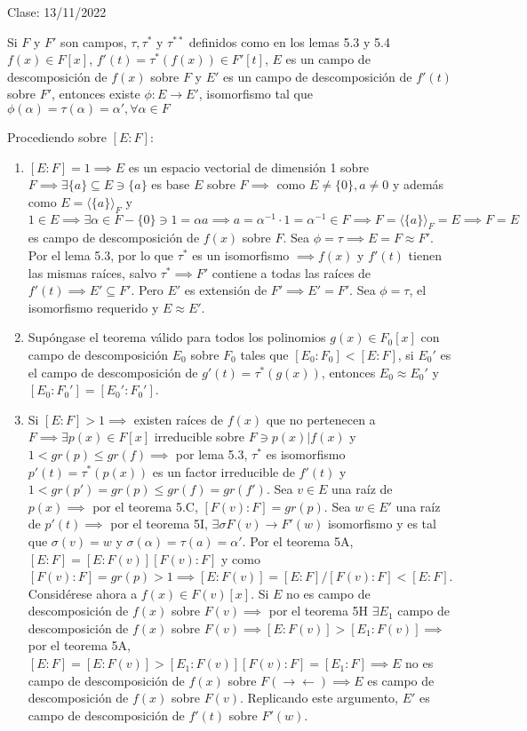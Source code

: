 Clase: 13/11/2022

\begin{teorema}
    Si $F$ y $F'$ son campos, $\tau,\tau^*$ y $\tau^{**}$ definidos como en los lemas 5.3 y 5.4 $f(x)\in F[x]$, $f'(t)=\tau^{*}(f(x))\in F'[t]$, $E$ es un campo de descomposición de $f(x)$ sobre $F$ y $E'$ es un campo de descomposición de $f'(t)$ sobre $F'$, entonces existe $\phi:E\to E'$, isomorfismo tal que $\phi(\alpha)=\tau(\alpha)=\alpha',\forall \alpha \in F$
    \begin{dem}
        Procediendo sobre $[E:F]$:
        \begin{enumerate}
            \item $[E:F]=1\implies E$ es un espacio vectorial de dimensión 1 sobre $F\implies \exists \{a\}\subseteq E\ni \{a\}$ es base $E$ sobre $F\implies$ como $E\not= \{0\},a\not=0$ y además como $E=\langle\{a\}\rangle_F$ y $1\in E\implies \exists \alpha\in F-\{0\}\ni 1=\alpha a\implies a=\alpha^{-1}\cdot 1=\alpha^{-1}\in F\implies F=\langle\{a\}\rangle_F=E\implies F=E$ es campo de descomposición de $f(x)$ sobre $F$. Sea $\phi =\tau\implies E=F\approx F'$. Por el lema 5.3, por lo que $\tau^*$ es un isomorfismo $\implies f(x)$ y $f'(t)$ tienen las mismas raíces, salvo $\tau^*\implies F'$ contiene a todas las raíces de $f'(t)\implies E'\subseteq F'$. Pero $E'$ es extensión de $F'\implies E'=F'$. Sea $\phi=\tau$, el isomorfismo requerido y $E\approx E'$.
            \item Supóngase el teorema válido para todos los polinomios $g(x)\in F_0[x]$ con campo de descomposición $E_0$ sobre $F_0$ tales que 
            $[E_0:F_0]<[E:F]$, si $E_0'$ es el campo de descomposición de $g'(t)=\tau^*(g(x))$, entonces $E_0\approx E_0'$ y $[E_0:F_0']=[E_0':F_0']$.
            \item Si $[E:F]>1\implies $ existen raíces de $f(x)$ que no pertenecen a $F\implies \exists p(x)\in F[x]$ irreducible sobre $F\ni p(x)|f(x)$ y $1<gr(p)\leq gr(f)\implies$ por lema 5.3, $\tau^*$ es isomorfismo $p'(t)=\tau^*(p(x))$ es un factor irreducible de $f'(t)$ y $1<gr(p')=gr(p)\leq gr(f)=gr(f')$. Sea $v\in E$ una raíz de $p(x)\implies$ por el teorema 5.C, $[F(v):F]=gr(p)$. Sea $w\in E'$ una raíz de $p'(t)\implies$ por el teorema 5I, $\exists\sigma F(v)\to F'(w)$ isomorfismo y es tal que $\sigma(v)=w$ y $\sigma(\alpha)=\tau(a)=\alpha'$. Por el teorema 5A, $[E:F]=[E:F(v)][F(v):F]$ y como $[F(v):F]=gr(p)>1\implies [E:F(v)]=[E:F]/[F(v):F]<[E:F]$. 
            Considérese ahora a $f(x)\in F(v)[x]$. Si $E$ no es campo de descomposición de $f(x)$ sobre $F(v)\implies$ por el teorema 5H $\exists E_1$ campo de descomposición de $f(x)$ sobre $F(v)\implies [E:F(v)]>[E_1:F(v)]\implies$ por el teorema 5A, $[E:F]=[E:F(v)]>[E_1:F(v)][F(v):F]=[E_1:F]\implies E$ no es campo de descomposición de $f(x)$ sobre $F(\to\gets)\implies E$ es campo de descomposición de $f(x)$ sobre $F(v)$. Replicando este argumento, $E'$ es campo de descomposición de $f'(t)$ sobre $F'(w)$.  

\end{enumerate}
\end{dem}
\end{teorema}
